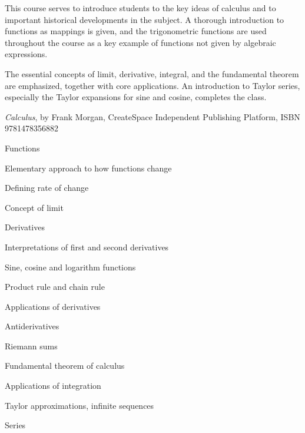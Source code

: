 \documentclass{osucourse}
\begin{document}
\CatalogDescription
\PrerequisitesAndExclusions

\begin{Purpose}
This course serves to introduce students to the key ideas of calculus and to important historical developments in the subject. A thorough introduction to functions as mappings is given, and the trigonometric functions are used throughout the course as a key example of functions not given by algebraic expressions.

The essential concepts of limit, derivative, integral, and the fundamental theorem are emphasized, together with core applications. An introduction to Taylor series, especially the Taylor expansions for sine and cosine, completes the class.
\end{Purpose}

\begin{Text}
\emph{Calculus}, by Frank Morgan, CreateSpace Independent Publishing Platform, ISBN 9781478356882
\end{Text}

\begin{TopicsList}
\item Functions
\item Elementary approach to how functions change
\item Defining rate of change
\item Concept of limit
\item Derivatives
\item Interpretations of first and second derivatives
\item Sine, cosine and logarithm functions
\item Product rule and chain rule
\item Applications of derivatives
\item Antiderivatives
\item Riemann sums
\item Fundamental theorem of calculus
\item Applications of integration
\item Taylor approximations, infinite sequences
\item Series
\end{TopicsList}
\end{document}
